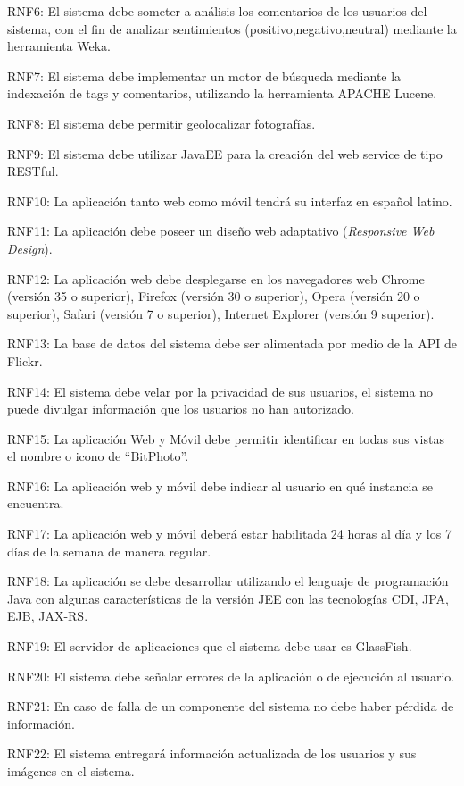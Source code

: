 \documentclass{memoria}
\begin{document}
RNF6: El sistema debe someter a análisis los comentarios de los usuarios del sistema, con el fin de analizar sentimientos (positivo,negativo,neutral) mediante la herramienta Weka.

RNF7: El sistema debe implementar un motor de búsqueda mediante la indexación de tags y comentarios, utilizando la  herramienta APACHE Lucene.

RNF8: El sistema debe permitir geolocalizar fotografías.

RNF9: El sistema debe utilizar JavaEE para la creación del web service de tipo RESTful.

RNF10: La aplicación tanto web como móvil tendrá su interfaz en español latino.

RNF11: La aplicación debe poseer un diseño web adaptativo (\textsl{Responsive Web Design}).

RNF12: La aplicación web debe desplegarse en los navegadores web Chrome (versión 35 o superior), Firefox (versión 30 o superior), Opera (versión 20 o superior), Safari (versión 7 o superior), Internet Explorer (versión 9 superior).

RNF13: La base de datos del sistema debe ser alimentada por medio de la API de Flickr.

RNF14: El sistema debe velar por la privacidad de sus usuarios, el sistema no puede divulgar información que los usuarios no han autorizado.

RNF15: La aplicación Web y Móvil debe permitir identificar en todas sus vistas el nombre o icono de “BitPhoto”.

RNF16: La aplicación web y móvil debe indicar al usuario en qué instancia se encuentra.

RNF17: La aplicación web y móvil deberá estar habilitada 24 horas al día y los 7 días de la semana de manera regular.

RNF18: La aplicación se debe desarrollar utilizando el lenguaje de programación Java con algunas características de la versión JEE con las tecnologías CDI, JPA, EJB, JAX-RS.

RNF19: El servidor de aplicaciones que el sistema debe usar es GlassFish.

RNF20: El sistema debe señalar errores de la aplicación o de ejecución al usuario.

RNF21: En caso de falla de un componente del sistema no debe haber pérdida de información.

RNF22: El sistema entregará información actualizada de los usuarios y sus imágenes en  el sistema.
\end{document}
